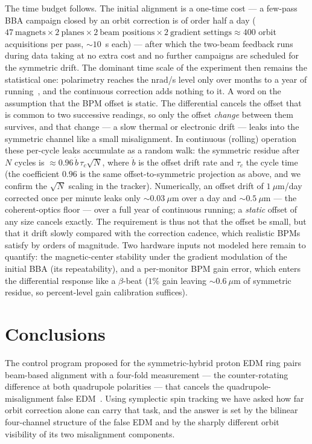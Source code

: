 \documentclass[aps,prab,reprint,superscriptaddress,nofootinbib]{revtex4-2}
\begin{document}
The time budget follows.  The initial alignment is a one-time cost --- a
few-pass BBA campaign closed by an orbit correction is of order half a day
($47~\text{magnets}\times2~\text{planes}\times2~\text{beam positions}\times
2~\text{gradient settings}\approx400$ orbit acquisitions per pass, $\sim\!10$~s
each) --- after which the two-beam feedback runs during data taking at no extra
cost and no further campaigns are scheduled for the symmetric drift.  The
dominant time scale of the experiment then remains the statistical one:
polarimetry reaches the nrad/s level only over months to a year of
running~\cite{polarimeter}, and the continuous correction adds nothing to it.
A word on the assumption that the BPM offset is static.  The differential
cancels the offset that is common to two successive readings, so only the offset
\emph{change} between them survives, and that change --- a slow thermal or
electronic drift --- leaks into the symmetric channel like a small misalignment.
In continuous (rolling) operation these per-cycle leaks accumulate as a random
walk: the symmetric residue after $N$ cycles is $\approx 0.96\,\dot b\,\tau_c
\sqrt{N}$, where $\dot b$ is the offset drift rate and $\tau_c$ the cycle time
(the coefficient $0.96$ is the same offset-to-symmetric projection as above, and
we confirm the $\sqrt{N}$ scaling in the tracker).  Numerically, an offset drift
of $1~\mu$m/day corrected once per minute leaks only $\sim\!0.03~\mu$m over a
day and $\sim\!0.5~\mu$m --- the coherent-optics floor --- over a full year of
continuous running; a \emph{static} offset of any size cancels exactly.  The
requirement is thus not that the offset be small, but that it drift slowly
compared with the correction cadence, which realistic BPMs satisfy by orders of
magnitude.  Two hardware inputs not modeled here remain to quantify: the
magnetic-center stability under the gradient modulation of the initial BBA (its
repeatability), and a per-monitor BPM gain error, which enters the differential
response like a $\beta$-beat ($1\%$ gain leaving $\sim\!0.6~\mu$m of symmetric
residue, so percent-level gain calibration suffices).


\section{Conclusions}
\label{sec:conclusions}

The control program proposed for the symmetric-hybrid proton EDM ring pairs
beam-based alignment with a four-fold measurement --- the counter-rotating
difference at both quadrupole polarities --- that cancels the
quadrupole-misalignment false EDM~\cite{omarov}.  Using symplectic spin
tracking we have asked how far orbit correction alone can carry that task, and
the answer is set by the bilinear four-channel structure of the false EDM and by
the sharply different orbit visibility of its two misalignment components.
\end{document}
